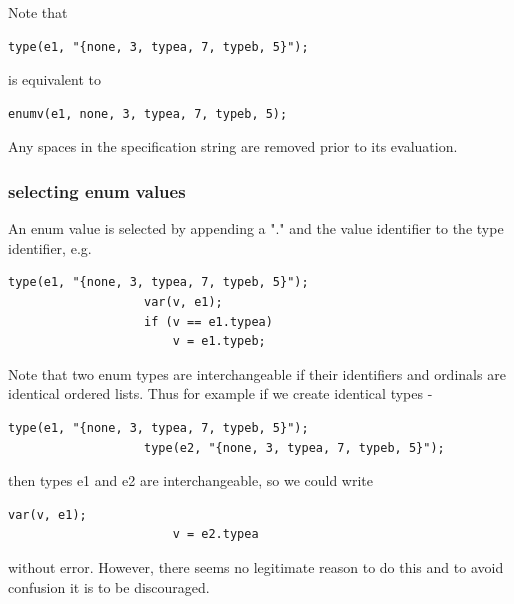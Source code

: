                 Note that
                \begin{lstlisting}[gobble=16, language=threepl]
                   type(e1, "{none, 3, typea, 7, typeb, 5}");
                \end{lstlisting}
                is equivalent to
                \begin{lstlisting}[gobble=16, language=threepl]
                   enumv(e1, none, 3, typea, 7, typeb, 5);
                \end{lstlisting}

                Any spaces in the specification string are removed prior
                to its evaluation.


            \subsubsection{selecting enum values}
            
                An enum value is selected by appending a "." and
                the value identifier to the type identifier, e.g.
                \begin{lstlisting}[gobble=16, language=threepl]
                   type(e1, "{none, 3, typea, 7, typeb, 5}");
                   var(v, e1);
                   if (v == e1.typea)
                       v = e1.typeb;
                \end{lstlisting}
                
                Note that two enum types are interchangeable if their
                identifiers and ordinals are identical ordered lists.
                Thus for example if we create identical types -
                \begin{lstlisting}[gobble=16, language=threepl]
                   type(e1, "{none, 3, typea, 7, typeb, 5}");
                   type(e2, "{none, 3, typea, 7, typeb, 5}");
                \end{lstlisting}
                then types e1 and e2 are interchangeable, so we could write
                \begin{lstlisting}[gobble=16, language=threepl]
                   var(v, e1);
                       v = e2.typea
                \end{lstlisting}
                without error. However, there seems no legitimate reason to do
                this and to avoid confusion it is to be discouraged.
                
                
                
